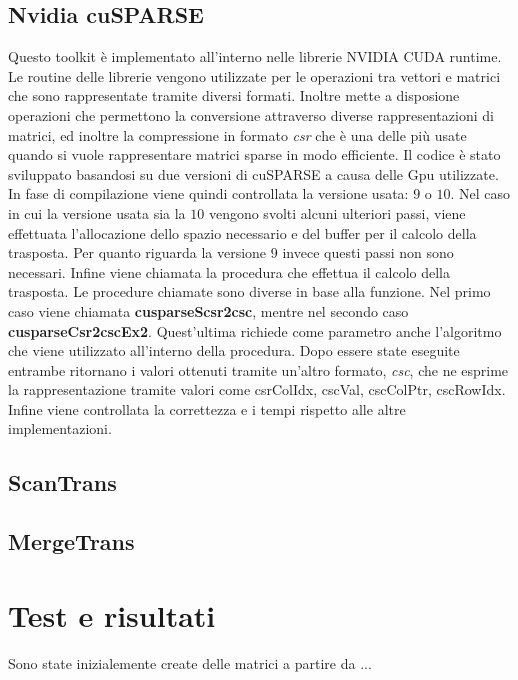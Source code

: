 \documentclass[]{IEEEtran}
\begin{document}
	\subsection{Nvidia cuSPARSE}
	Questo toolkit è implementato all'interno nelle librerie NVIDIA CUDA runtime. Le routine delle librerie vengono utilizzate per le operazioni tra vettori e matrici che sono rappresentate tramite diversi formati. Inoltre mette a disposione operazioni che permettono la conversione attraverso diverse rappresentazioni di matrici, ed inoltre la compressione in formato \textit{csr} che è una delle più usate quando si vuole rappresentare matrici sparse in modo efficiente.\newline	
	Il codice è stato sviluppato basandosi su due versioni di cuSPARSE a causa delle Gpu utilizzate. In fase di compilazione viene quindi controllata la versione usata: $ 9 $ o $ 10 $.\newline
	Nel caso in cui la versione usata sia la $ 10 $ vengono svolti alcuni ulteriori passi, viene effettuata l'allocazione dello spazio necessario e del buffer per il calcolo della trasposta. Per quanto riguarda la versione $ 9 $ invece questi passi non sono necessari.\newline
	Infine viene chiamata la procedura che effettua il calcolo della trasposta. \newline
	Le procedure chiamate sono diverse in base alla funzione. Nel primo caso viene chiamata \textbf{cusparseScsr2csc}, mentre nel secondo caso \textbf{cusparseCsr2cscEx2}. Quest'ultima richiede come parametro anche l'algoritmo che viene utilizzato all'interno della procedura.\newline
	Dopo essere state eseguite entrambe ritornano i valori ottenuti tramite un'altro formato, \textit{csc}, che ne esprime la rappresentazione tramite valori come csrColIdx, cscVal, cscColPtr, cscRowIdx. Infine viene controllata la correttezza e i tempi rispetto alle altre implementazioni.

	\subsection{ScanTrans}
	
	
	\subsection{MergeTrans}
	

\section{Test e risultati}
\label{test-risultati}
	Sono state inizialemente create delle matrici a partire da ...
	
\end{document}
